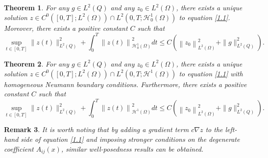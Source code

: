 \documentclass[9pt,reqno]{amsart}
\newtheorem{theorem}{Theorem}
\theoremstyle{plain}
\newtheorem{remark}[theorem]{Remark}
\numberwithin{equation}{section}
\numberwithin{theorem}{section}
\def\Om{\Omega}
\def\Om{\Omega}
\def\mcH{\mathcal{H}}
\begin{document}
	\begin{theorem}\label{exist1}
		For any $g \in L^2(Q)$ and any $z_0 \in L^2(\Omega)$, there exists a unique solution $z \in C^0([0,T];L^2(\Omega)) \cap L^2(0,T;\mathcal{H}_0^1(\Omega))$ to equation \eqref{1.1}. Moreover, there exists a positive constant $C$ such that
		$$
		\sup_{t\in\left[0,T\right] } \|z(t)\|_{L^2(Q)}^2 + \int_{0}^{T} \left\| z(t)\right\|^2_{\mcH_0^1(\Omega)} d t \le C(\left\| z_0\right\|_{L^2(\Om)}^2 + \|g\|_{L^2(Q)}^2).
		$$
	\end{theorem}
	\begin{theorem}\label{exist2}
		For any $g \in L^2(Q)$ and any $z_0 \in L^2(\Omega)$, there exists a unique solution $z \in C^0([0,T];L^2(\Omega)) \cap L^2(0,T;\mathcal{H}^1(\Omega))$ to equation \eqref{1.1} with homogeneous Neumann boundary conditions. Furthermore, there exists a positive constant $C$ such that
		$$
		\sup_{t\in\left[0,T\right] } \|z(t)\|_{L^2(Q)}^2 + \int_{0}^{T} \left\| z(t)\right\|^2_{\mcH^1(\Omega)} d t \le C(\left\| z_0\right\|_{L^2(\Om)}^2 + \|g\|_{L^2(Q)}^2).
		$$
	\end{theorem}
	\begin{remark}
		It is worth noting that by adding a gradient term $c\nabla z$ to the left-hand side of equation \eqref{1.1} and imposing stronger conditions on the degenerate coefficient $A_{ij}(x)$, similar well-posedness results can be obtained.
	\end{remark}
	
	
\end{document}

